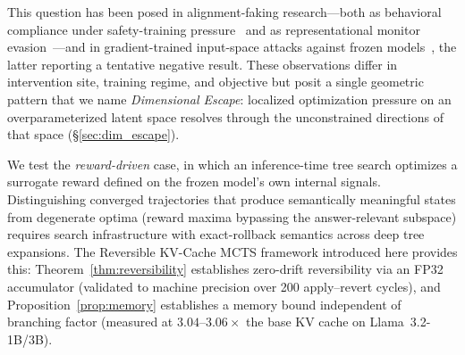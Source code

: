 \documentclass{article}
\begin{document}
This question has been posed in alignment-faking research---both as behavioral compliance under safety-training pressure~\cite{greenblatt2024alignment, hubinger2024sleeper} and as representational monitor evasion~\cite{gupta2025rlobfuscation}---and in gradient-trained input-space attacks against frozen models~\cite{bailey2024obfuscated}, the latter reporting a tentative negative result. These observations differ in intervention site, training regime, and objective but posit a single geometric pattern that we name \emph{Dimensional Escape}: localized optimization pressure on an overparameterized latent space resolves through the unconstrained directions of that space (§\ref{sec:dim_escape}).

We test the \emph{reward-driven} case, in which an inference-time tree search optimizes a surrogate reward defined on the frozen model's own internal signals. Distinguishing converged trajectories that produce semantically meaningful states from degenerate optima (reward maxima bypassing the answer-relevant subspace) requires search infrastructure with exact-rollback semantics across deep tree expansions. The Reversible KV-Cache MCTS framework introduced here provides this: Theorem~\ref{thm:reversibility} establishes zero-drift reversibility via an FP32 accumulator (validated to machine precision over 200 apply--revert cycles), and Proposition~\ref{prop:memory} establishes a memory bound independent of branching factor (measured at $3.04$--$3.06\times$ the base KV cache on Llama~3.2-1B/3B).
\end{document}

